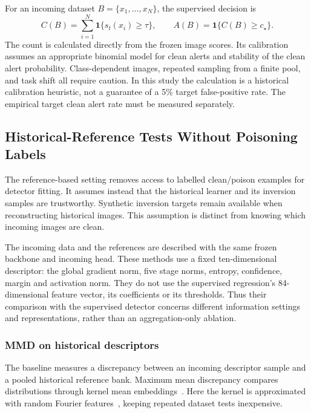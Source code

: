 For an incoming dataset $B=\{x_1,\ldots,x_N\}$, the supervised decision is
\begin{equation}
    C(B)=\sum_{i=1}^{N}\mathbf{1}\{s_t(x_i)\geq\tau\},
    \qquad
    A(B)=\mathbf{1}\{C(B)\geq c_\star\}.
    \label{eq:methods-dataset-decision}
\end{equation}
The count is calculated directly from the frozen image scores. Its
calibration assumes an appropriate binomial model for clean alerts and
stability of the clean alert probability. Class-dependent images, repeated
sampling from a finite pool, and task shift all require caution. In this
study the calculation is a historical calibration heuristic, not a
guarantee of a 5\% target false-positive rate. The empirical target clean
alert rate must be measured separately.

\subsection{Historical-Reference Tests Without Poisoning Labels}
\label{subsec:methods-unsupervised}

The reference-based setting removes access to labelled clean/poison
examples for detector fitting. It assumes instead that the historical
learner and its inversion samples are trustworthy. Synthetic inversion
targets remain available when reconstructing historical images. This
assumption is distinct from knowing which incoming images are clean.

The incoming data and the references are described with the same frozen
backbone and incoming head. These methods use a fixed ten-dimensional
descriptor: the global gradient norm, five stage norms, entropy,
confidence, margin and activation norm. They do not use the supervised
regression's 84-dimensional feature vector, its coefficients or its
thresholds. Thus their comparison with the supervised detector concerns
different information settings and representations, rather than an
aggregation-only ablation.

\subsubsection{MMD on historical descriptors}
\label{subsubsec:methods-mmd}

The baseline measures a discrepancy between an incoming descriptor sample
and a pooled historical reference bank. Maximum mean discrepancy compares
distributions through kernel mean embeddings~\cite{gretton2012mmd}.
Here the kernel is approximated with random Fourier
features~\cite{rahimi2007random}, keeping repeated dataset tests inexpensive.

